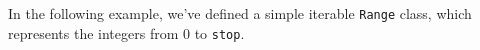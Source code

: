 In the following example, we've defined a simple iterable \lstinline$Range$
class, which represents the integers from 0 to \lstinline$stop$.

\begin{minipage}{0.5\columnwidth}
    
\end{minipage}
\begin{minipage}{0.5\columnwidth}

\end{minipage}

